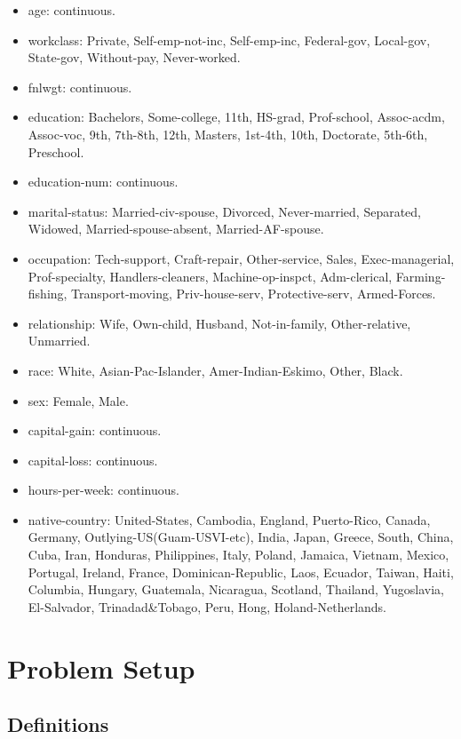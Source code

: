 \documentclass[twocolumn]{article}
\begin{document}
\begin{itemize}
\item age: continuous. 
\item workclass: Private, Self-emp-not-inc, Self-emp-inc, Federal-gov, Local-gov, State-gov, Without-pay, Never-worked. 
\item fnlwgt: continuous. 
\item education: Bachelors, Some-college, 11th, HS-grad, Prof-school, Assoc-acdm, Assoc-voc, 9th, 7th-8th, 12th, Masters, 1st-4th, 10th, Doctorate, 5th-6th, Preschool. 
\item education-num: continuous. 
\item marital-status: Married-civ-spouse, Divorced, Never-married, Separated, Widowed, Married-spouse-absent, Married-AF-spouse. 
\item occupation: Tech-support, Craft-repair, Other-service, Sales, Exec-managerial, Prof-specialty, Handlers-cleaners, Machine-op-inspct, Adm-clerical, Farming-fishing, Transport-moving, Priv-house-serv, Protective-serv, Armed-Forces. 
\item relationship: Wife, Own-child, Husband, Not-in-family, Other-relative, Unmarried. 
\item race: White, Asian-Pac-Islander, Amer-Indian-Eskimo, Other, Black. 
\item sex: Female, Male. 
\item capital-gain: continuous. 
\item capital-loss: continuous. 
\item hours-per-week: continuous. 
\item native-country: United-States, Cambodia, England, Puerto-Rico, Canada, Germany, Outlying-US(Guam-USVI-etc), India, Japan, Greece, South, China, Cuba, Iran, Honduras, Philippines, Italy, Poland, Jamaica, Vietnam, Mexico, Portugal, Ireland, France, Dominican-Republic, Laos, Ecuador, Taiwan, Haiti, Columbia, Hungary, Guatemala, Nicaragua, Scotland, Thailand, Yugoslavia, El-Salvador, Trinadad\&Tobago, Peru, Hong, Holand-Netherlands.
\end{itemize}

\section{Problem Setup}

\subsection{Definitions}
\end{document}
